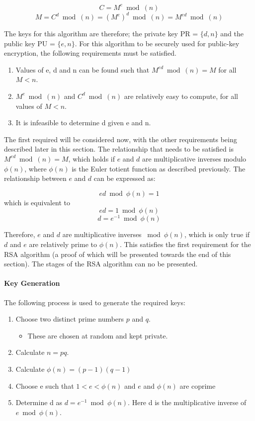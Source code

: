 \documentclass[a4paper,12pt]{report}
\begin{document}
\[ C = M^{e} \bmod(n) \]
\[ M = C^{d} \bmod(n) = (M^{e})^{d} \bmod(n) = M^{ed} \bmod(n)\]

The keys for this algorithm are therefore; the private key PR = $\{d,n\}$ and the public key PU = $\{e,n\}$. For this algorithm to be securely used for public-key encryption, the following requirements must be satisfied.
\begin{enumerate}
  \item Values of e, d and n can be found such that $ M^{ed} \bmod(n) = M $ for all $ M < n $.
  \item $ M^{e} \bmod(n) $ and $ C^{d} \bmod(n) $ are relatively easy to compute, for all values of $ M < n $.
  \item It is infeasible to determine d given e and n.
\end{enumerate}

The first required will be considered now, with the other requirements being described later in this section. The relationship that needs to be satisfied is $ M^{ed} \bmod(n) = M $, which holds if $e$ and $d$ are multiplicative inverses modulo $\phi(n)$, where $\phi(n)$ is the Euler totient function as described previously. The relationship between $e$ and $d$ can be expressed as:

\[ ed \bmod \phi(n) = 1 \]
which is equivalent to
\[ ed = 1 \bmod \phi(n) \]
\[ d = e^{-1} \bmod \phi(n) \]

Therefore, $e$ and $d$ are multiplicative inverses $\bmod \phi(n)$, which is only true if $d$ and $e$ are relatively prime to $\phi(n)$. This satisfies the first requirement for the RSA algorithm (a proof of which will be presented towards the end of this section). The stages of the RSA algorithm can no be presented. 

\paragraph{Key Generation}

The following process is used to generate the required keys:

\begin{enumerate}
  \item Choose two distinct prime numbers $p$ and $q$.
  \begin{itemize}
    \item These are chosen at random and kept private.
  \end{itemize}
  
  \item Calculate $ n=pq $.
  
  \item Calculate $ \phi(n)=(p-1)(q-1) $
  
  \item Choose e such that $ 1 < e < \phi (n) $ and $e$ and $ \phi(n) $ are coprime
  
  \item Determine d as $ d = e^{-1} \bmod \phi (n) $. Here d is the multiplicative inverse of $ e \bmod \phi (n) $.
  
\end{enumerate}
\end{document}
